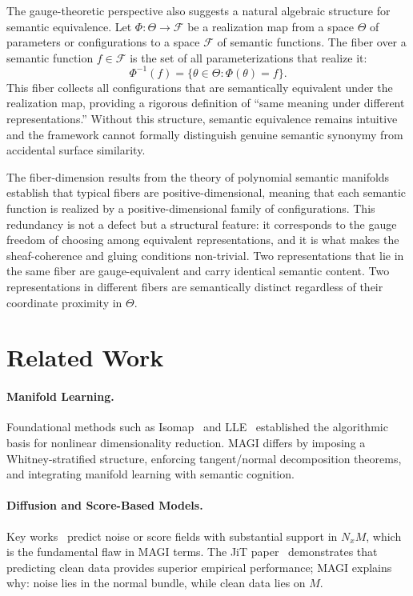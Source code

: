 \documentclass[11pt,a4paper,twocolumn]{article}
\begin{document}
The gauge-theoretic perspective also suggests a natural
algebraic structure for semantic equivalence. Let
$\Phi : \Theta \to \mathcal{F}$ be a realization map from a space
$\Theta$ of parameters or configurations to a space $\mathcal{F}$
of semantic functions. The fiber over a semantic function $f \in
\mathcal{F}$ is the set of all parameterizations that realize it:
\[
\Phi^{-1}(f) = \{\theta \in \Theta : \Phi(\theta) = f\}.
\]
This fiber collects all configurations that are semantically
equivalent under the realization map, providing a rigorous
definition of ``same meaning under different representations.''
Without this structure, semantic equivalence remains intuitive
and the framework cannot formally distinguish genuine semantic
synonymy from accidental surface similarity.

The fiber-dimension results from the theory of polynomial semantic
manifolds establish that typical fibers are positive-dimensional,
meaning that each semantic function is realized by a
positive-dimensional family of configurations. This redundancy
is not a defect but a structural feature: it corresponds to the
gauge freedom of choosing among equivalent representations,
and it is what makes the sheaf-coherence and gluing conditions
non-trivial. Two representations that lie in the same fiber are
gauge-equivalent and carry identical semantic content. Two
representations in different fibers are semantically distinct
regardless of their coordinate proximity in $\Theta$.


\section{Related Work}

\paragraph{Manifold Learning.}
Foundational methods such as Isomap~\cite{tenenbaum2000isomap} and
LLE~\cite{roweis2000lle} established the algorithmic basis for
nonlinear dimensionality reduction. MAGI differs by imposing a
Whitney-stratified structure, enforcing tangent/normal decomposition
theorems, and integrating manifold learning with semantic cognition.

\paragraph{Diffusion and Score-Based Models.}
Key works~\cite{ho2020denoising,song2021scorebased,karras2022elucidating}
predict noise or score fields with substantial support in $N_x M$,
which is the fundamental flaw in MAGI terms. The JiT
paper~\cite{li2025backtobasics} demonstrates that predicting clean data
provides superior empirical performance; MAGI explains why: noise lies
in the normal bundle, while clean data lies on $M$.
\end{document}

